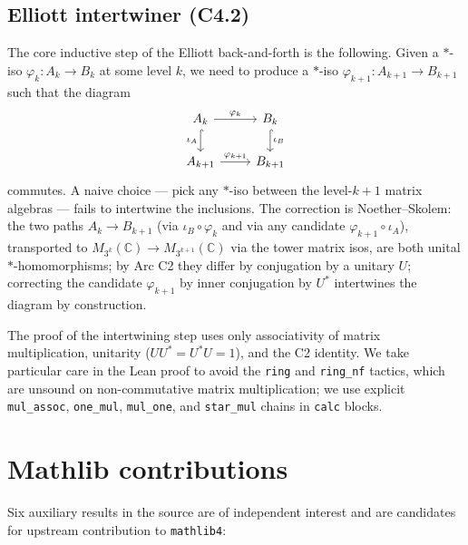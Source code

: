 \documentclass[11pt,a4paper]{article}
\theoremstyle{plain}
\theoremstyle{definition}
\begin{document}
\subsection{Elliott intertwiner (C4.2)}
\label{sec:c42}

The core inductive step of the Elliott back-and-forth is the following. Given a $\ast$-iso $\varphi_k : A_k \to B_k$ at some level $k$, we need to produce a $\ast$-iso $\varphi_{k+1} : A_{k+1} \to B_{k+1}$ such that the diagram
\[
\begin{tikzcd}
A_k \arrow[r, "\varphi_k"] \arrow[d, hook, "\iota_A"'] & B_k \arrow[d, hook, "\iota_B"] \\
A_{k+1} \arrow[r, "\varphi_{k+1}"] & B_{k+1}
\end{tikzcd}
\]
commutes. A naive choice --- pick any $\ast$-iso between the level-$k{+}1$ matrix algebras --- fails to intertwine the inclusions. The correction is Noether--Skolem: the two paths $A_k \to B_{k+1}$ (via $\iota_B \circ \varphi_k$ and via any candidate $\varphi_{k+1} \circ \iota_A$), transported to $M_{3^k}(\mathbb{C}) \to M_{3^{k+1}}(\mathbb{C})$ via the tower matrix isos, are both unital $\ast$-homomorphisms; by Arc C2 they differ by conjugation by a unitary $U$; correcting the candidate $\varphi_{k+1}$ by inner conjugation by $U^{\ast}$ intertwines the diagram by construction.

The proof of the intertwining step uses only associativity of matrix multiplication, unitarity ($U U^{\ast} = U^{\ast} U = 1$), and the C2 identity. We take particular care in the Lean proof to avoid the \texttt{ring} and \texttt{ring\_nf} tactics, which are unsound on non-commutative matrix multiplication; we use explicit \texttt{mul\_assoc}, \texttt{one\_mul}, \texttt{mul\_one}, and \texttt{star\_mul} chains in \texttt{calc} blocks.

\section{Mathlib contributions}
\label{sec:mathlib-gaps}

Six auxiliary results in the source are of independent interest and are candidates for upstream contribution to \texttt{mathlib4}:
\end{document}
